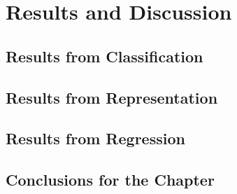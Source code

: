 \chapter{Results and Discussion}\label{cap:results_discussion}

\section{Results from Classification}




\section{Results from Representation}




\section{Results from Regression}





\section{Conclusions for the Chapter}